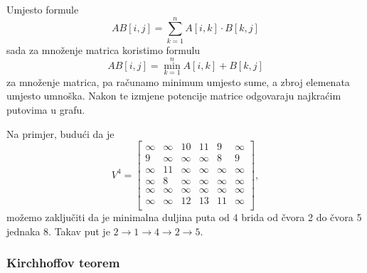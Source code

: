 Umjesto formule
\[
AB[i,j] = \sum_{k=1}^n A[i,k] \cdot B[k,j]
\]
sada za množenje matrica koristimo formulu
\[
AB[i,j] = \min_{k=1}^n A[i,k] + B[k,j]
\]
za množenje matrica, pa računamo
minimum umjesto sume,
a zbroj elemenata umjesto umnoška.
Nakon te izmjene
potencije matrice odgovaraju
najkraćim putovima u grafu.

Na primjer, budući da je
\[
V^4= \begin{bmatrix}
  \infty & \infty & 10 & 11 & 9 & \infty \\
  9 & \infty & \infty & \infty & 8 & 9 \\
  \infty & 11 & \infty & \infty & \infty & \infty \\
  \infty & 8 & \infty & \infty & \infty & \infty \\
  \infty & \infty & \infty & \infty & \infty & \infty \\
  \infty & \infty & 12 & 13 & 11 & \infty \\
 \end{bmatrix},
\]
možemo zaključiti da je minimalna duljina puta
od 4 brida
od čvora 2 do čvora 5 jednaka 8.
Takav put je
$2 \rightarrow 1 \rightarrow 4 \rightarrow 2 \rightarrow 5$.

\subsubsection{Kirchhoffov teorem}



